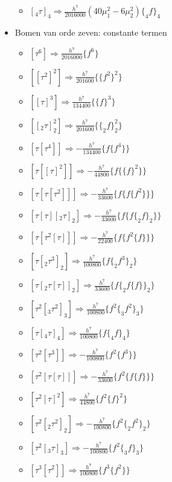 \documentclass[12pt]{article}
\begin{document}
\begin{itemize}
\begin{itemize}
        \item \([_4\tau]_4\Rightarrow\frac{h^7}{2016000}(40\mu_1^2-6\mu_2^2)\{_4f\}_4\)
    \end{itemize}
    \item Bomen van orde zeven: constante termen
    \begin{itemize}
        \item \([\tau^6]\Rightarrow\frac{h^7}{2016000}\{f^6\}\)
        \item \([[\tau^2]^2]\Rightarrow\frac{h^7}{201600}\{\{f^2\}^2\}\)
        \item \([[\tau]^3]\Rightarrow\frac{h^7}{134400}\{\{f\}^3\}\)
        \item \([[_2\tau]^2_2]\Rightarrow\frac{h^7}{201600}\{\{_2f\}_2^2\}\)
        \item \([\tau[\tau^4]]\Rightarrow-\frac{h^7}{134400}\{f\{f^4\}\}\)
        \item \([\tau[[\tau]^2]]\Rightarrow-\frac{h^7}{44800}\{f\{\{f\}^2\}\}\)
        \item \([\tau[\tau[\tau^2]]]\Rightarrow-\frac{h^7}{33600}\{f\{f\{f^2\}\}\}\)
        \item \([\tau[\tau][_2\tau]_2]\Rightarrow-\frac{h^7}{33600}\{f\{f\{_2f\}_2\}\}\)
        \item \([\tau[\tau^2[\tau]]]\Rightarrow-\frac{h^7}{22400}\{f\{f^2\{f\}\}\}\)
        \item \([\tau[_2\tau^3]_2]\Rightarrow\frac{h^7}{100800}\{f\{_2f^3\}_2\}\)
        \item \([\tau[_2\tau[\tau]]_2]\Rightarrow\frac{h^7}{33600}\{f\{_2f\{f\}\}_2\}\)
        \item \([\tau^2[_3\tau^2]_3]\Rightarrow\frac{h^7}{100800}\{f^2\{_3f^2\}_3\}\)
        \item \([\tau[_4\tau]_4]\Rightarrow\frac{h^7}{100800}\{f\{_4f\}_4\}\)
        \item \([\tau^2[\tau^3]]\Rightarrow-\frac{h^7}{100800}\{f^2\{f^3\}\}\)
        \item \([\tau^2[\tau[\tau]]]\Rightarrow-\frac{h^7}{33600}\{f^2\{f\{f\}\}\}\)
        \item \([\tau^2[\tau]^2]\Rightarrow\frac{h^7}{44800}\{f^2\{f\}^2\}\)
        \item \([\tau^2[_2\tau^2]_2]\Rightarrow-\frac{h^7}{100800}\{f^2\{_2f^2\}_2\}\)
        \item \([\tau^2[_3\tau]_3]\Rightarrow-\frac{h^7}{100800}\{f^2\{_3f\}_3\}\)
        \item \([\tau^3[\tau^2]]\Rightarrow\frac{h^7}{100800}\{f^3\{f^2\}\}\)

\end{itemize}
\end{itemize}
\end{document}

